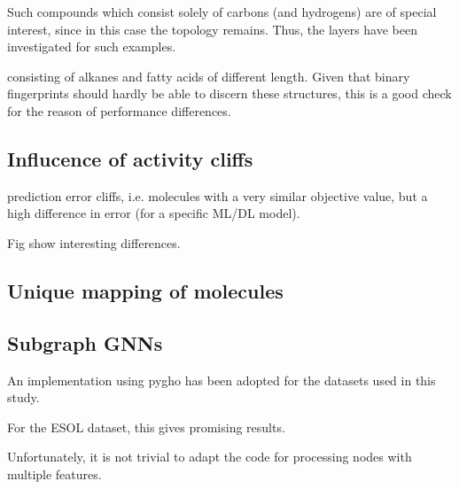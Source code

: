 Such compounds which consist solely of carbons (and hydrogens) are of special interest, since in this case the topology remains.
Thus, the layers have been investigated for such examples.


consisting of alkanes and fatty acids of different length.
\cite{Schweidtmann.2023}
Given that binary fingerprints should hardly be able to discern these structures, this is a good check for the reason of performance differences.


\subsection{Influcence of activity cliffs}

prediction error cliffs, i.e. molecules with a very similar objective value, but a high difference in error (for a specific ML/DL model). 

Fig
show interesting differences.

\subsection{Unique mapping of molecules}




\subsection{Subgraph GNNs}

An implementation using pygho has been adopted for the datasets used in this study.

For the ESOL dataset, this gives promising results.

Unfortunately, it is not trivial to adapt the code for processing nodes with multiple features.